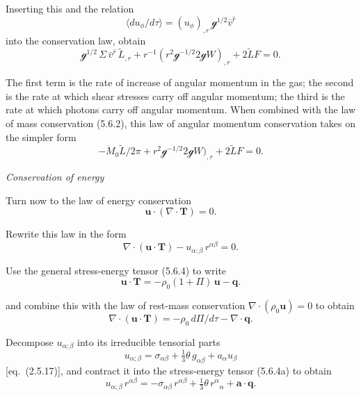 Inserting this and the relation
\begin{equation}
\langle du_\phi/d\tau \rangle = (u_\phi)_{,r}\, \mathscr{g}^{1/2} \bar{v}^{\hat{r}}
\tag{5.6.5}
\end{equation}
into the conservation law, obtain
\begin{equation}
\mathscr{g}^{1/2}\,\Sigma\,\bar{v}^{\hat{r}}\,\tilde{L}_{,r}
+ r^{-1}(r^2\mathscr{g}^{-1/2}2\mathscr{g}W)_{,r} + 2\tilde{L}F = 0.
\tag{5.6.5}
\end{equation}

The first term is the rate of increase of angular momentum in the gas; the second
is the rate at which shear stresses carry off angular momentum; the third is the
rate at which photons carry off angular momentum.  When combined with the
law of mass conservation (5.6.2), this law of angular momentum conservation
takes on the simpler form
\begin{equation}
-\dot{M}_0 \tilde{L}/2\pi + r^2 \mathscr{g}^{-1/2} 2\mathscr{g} W)_{,r}
+ 2\tilde{L}F = 0.
\tag{5.6.6}
\end{equation}

\bigskip
\noindent\textit{Conservation of energy}

\medskip
Turn now to the law of energy conservation
\begin{equation}
\mathbf{u} \cdot (\nabla \cdot \mathbf{T}) = 0.
\tag{5.6.7}
\end{equation}

Rewrite this law in the form
\begin{equation}
\nabla \cdot (\mathbf{u} \cdot \mathbf{T}) - u_{\alpha;\beta}\, r^{\alpha\beta} = 0.
\tag{5.6.8}
\end{equation}

Use the general stress-energy tensor (5.6.4) to write
\begin{equation}
\mathbf{u} \cdot \mathbf{T} = -\rho_0(1+\Pi)\,\mathbf{u} - \mathbf{q}.
\tag{5.6.9}
\end{equation}

and combine this with the law of rest-mass conservation $\nabla \cdot (\rho_0 \mathbf{u}) = 0$ to obtain
\begin{equation}
\nabla \cdot (\mathbf{u} \cdot \mathbf{T}) = -\rho_0\, d\Pi/d\tau
- \nabla \cdot \mathbf{q}.
\end{equation}

Decompose $u_{\alpha;\beta}$ into its irreducible tensorial parts
\begin{equation}
u_{\alpha;\beta} = \sigma_{\alpha\beta} + \tfrac{1}{3}\theta\, g_{\alpha\beta} + a_\alpha u_\beta
\end{equation}
[eq.\ (2.5.17)], and contract it into the stress-energy tensor (5.6.4a) to obtain
\begin{equation}
u_{\alpha;\beta}\, r^{\alpha\beta} = -\sigma_{\alpha\beta}\,r^{\alpha\beta}
+ \tfrac{1}{3}\theta\, r^\alpha{}_\alpha + \mathbf{a} \cdot \mathbf{q}.
\tag{5.6.10}
\end{equation}

